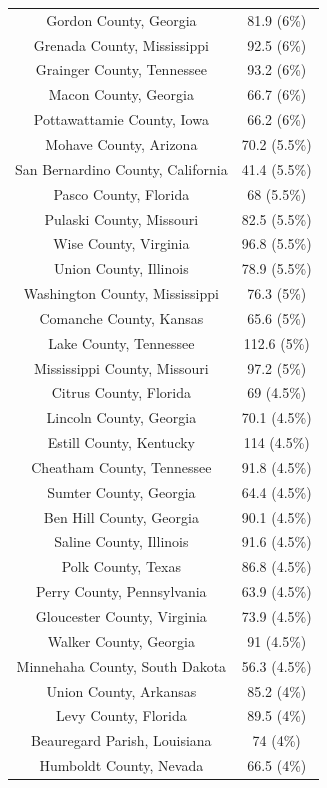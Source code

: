 \begin{table}[ht]
\begin{tabular}{cc}
  Gordon County, Georgia & 81.9 (6\%) \\ 
  Grenada County, Mississippi & 92.5 (6\%) \\ 
  Grainger County, Tennessee & 93.2 (6\%) \\ 
  Macon County, Georgia & 66.7 (6\%) \\ 
  Pottawattamie County, Iowa & 66.2 (6\%) \\ 
  Mohave County, Arizona & 70.2 (5.5\%) \\ 
  San Bernardino County, California & 41.4 (5.5\%) \\ 
  Pasco County, Florida & 68 (5.5\%) \\ 
  Pulaski County, Missouri & 82.5 (5.5\%) \\ 
  Wise County, Virginia & 96.8 (5.5\%) \\ 
  Union County, Illinois & 78.9 (5.5\%) \\ 
  Washington County, Mississippi & 76.3 (5\%) \\ 
  Comanche County, Kansas & 65.6 (5\%) \\ 
  Lake County, Tennessee & 112.6 (5\%) \\ 
  Mississippi County, Missouri & 97.2 (5\%) \\ 
  Citrus County, Florida & 69 (4.5\%) \\ 
  Lincoln County, Georgia & 70.1 (4.5\%) \\ 
  Estill County, Kentucky & 114 (4.5\%) \\ 
  Cheatham County, Tennessee & 91.8 (4.5\%) \\ 
  Sumter County, Georgia & 64.4 (4.5\%) \\ 
  Ben Hill County, Georgia & 90.1 (4.5\%) \\ 
  Saline County, Illinois & 91.6 (4.5\%) \\ 
  Polk County, Texas & 86.8 (4.5\%) \\ 
  Perry County, Pennsylvania & 63.9 (4.5\%) \\ 
  Gloucester County, Virginia & 73.9 (4.5\%) \\ 
  Walker County, Georgia & 91 (4.5\%) \\ 
  Minnehaha County, South Dakota & 56.3 (4.5\%) \\ 
  Union County, Arkansas & 85.2 (4\%) \\ 
  Levy County, Florida & 89.5 (4\%) \\ 
  Beauregard Parish, Louisiana & 74 (4\%) \\ 
  Humboldt County, Nevada & 66.5 (4\%) \\ 

\end{tabular}
\end{table}
